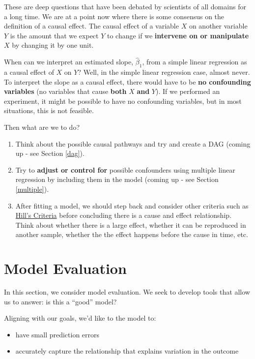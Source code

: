 \documentclass[
]{book}
\providecommand{\tightlist}{%
  \setlength{\itemsep}{0pt}\setlength{\parskip}{0pt}}
\begin{document}
These are deep questions that have been debated by scientists of all domains for a long time. We are at a point now where there is some consensus on the definition of a causal effect. The causal effect of a variable \(X\) on another variable \(Y\) is the amount that we expect \(Y\) to change if we \textbf{intervene on or manipulate} \(X\) by changing it by one unit.

When can we interpret an estimated slope, \(\hat{\beta}_1\), from a simple linear regression as a causal effect of \(X\) on \(Y\)? Well, in the simple linear regression case, almost never. To interpret the slope as a causal effect, there would have to be \textbf{no confounding variables} (no variables that cause \textbf{both} \(X\) \textbf{and} \(Y\)). If we performed an experiment, it might be possible to have no confounding variables, but in most situations, this is not feasible.

Then what are we to do?

\begin{enumerate}
\def\labelenumi{\arabic{enumi}.}
\tightlist
\item
  Think about the possible causal pathways and try and create a DAG (coming up - see Section \ref{dag}).
\item
  Try to \textbf{adjust or control for} possible confounders using multiple linear regression by including them in the model (coming up - see Section \ref{multiple}).
\item
  After fitting a model, we should step back and consider other criteria such as \href{https://en.wikipedia.org/wiki/Bradford_Hill_criteria}{Hill's Criteria} before concluding there is a cause and effect relationship. Think about whether there is a large effect, whether it can be reproduced in another sample, whether the the effect happens before the cause in time, etc.
\end{enumerate}

\section{Model Evaluation}\label{model-evaluation}

In this section, we consider model evaluation. We seek to develop tools that allow us to answer: is this a ``good'' model?

Aligning with our goals, we'd like to the model to:

\begin{itemize}
\tightlist
\item
  have small prediction errors
\item
  accurately capture the relationship that explains variation in the outcome
\end{itemize}
\end{document}
